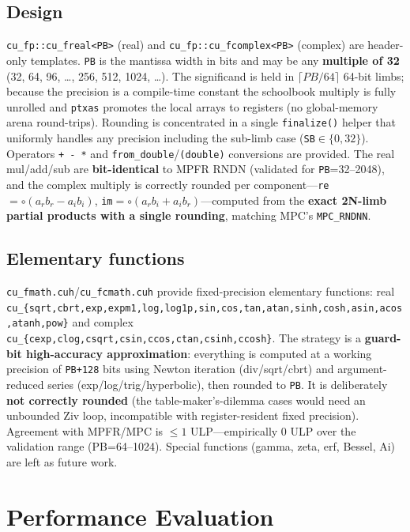 \documentclass[uplatex,dvipdfmx,a4paper,11pt]{jsarticle}
\newcommand{\code}[1]{\texttt{#1}}
\begin{document}
\subsection{Design}

\code{cu\_fp::cu\_freal<PB>} (real) and \code{cu\_fp::cu\_fcomplex<PB>} (complex)
are header-only templates. \code{PB} is the mantissa width in bits and may be any
\textbf{multiple of 32} (32, 64, 96, \dots, 256, 512, 1024, \dots). The
significand is held in $\lceil PB/64\rceil$ 64-bit limbs; because the precision is
a compile-time constant the schoolbook multiply is fully unrolled and
\code{ptxas} promotes the local arrays to registers (no global-memory arena
round-trips). Rounding is concentrated in a single \code{finalize()} helper that
uniformly handles any precision including the sub-limb case
(\code{SB}$\in\{0,32\}$). Operators \code{+ - *} and \code{from\_double}/\code{(double)}
conversions are provided. The real mul/add/sub are \textbf{bit-identical} to MPFR
RNDN (validated for \code{PB}=32--2048), and the complex multiply is correctly
rounded per component---\code{re}$=\circ(a_r b_r - a_i b_i)$,
\code{im}$=\circ(a_r b_i + a_i b_r)$---computed from the \textbf{exact 2N-limb
partial products with a single rounding}, matching MPC's \code{MPC\_RNDNN}.

\subsection{Elementary functions}

\code{cu\_fmath.cuh}/\code{cu\_fcmath.cuh} provide fixed-precision elementary
functions: real
\code{cu\_\{sqrt,cbrt,exp,expm1,log,log1p,sin,cos,tan,atan,sinh,cosh,asin,acos,atanh,pow\}}
and complex \code{cu\_\{cexp,clog,csqrt,csin,ccos,ctan,csinh,ccosh\}}. The strategy
is a \textbf{guard-bit high-accuracy approximation}: everything is computed at a
working precision of \code{PB+128} bits using Newton iteration (div/sqrt/cbrt) and
argument-reduced series (exp/log/trig/hyperbolic), then rounded to \code{PB}.
It is deliberately \textbf{not correctly rounded} (the table-maker's-dilemma cases
would need an unbounded Ziv loop, incompatible with register-resident fixed
precision). Agreement with MPFR/MPC is $\le 1$ ULP---empirically 0 ULP over the
validation range (PB=64--1024). Special functions (gamma, zeta, erf, Bessel, Ai)
are left as future work.

\section{Performance Evaluation}
\label{sec:perf}
\end{document}
